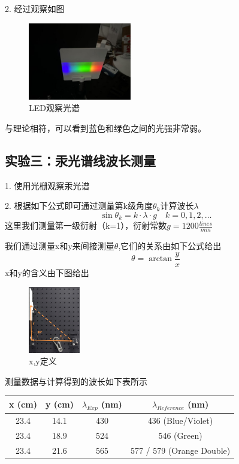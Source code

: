 \documentclass{ctexart}
\begin{document}
2. 经过观察如图
\begin{figure}[H]
    \centering
    \includegraphics[width=0.4\textwidth,height=0.2\textwidth]{pictures/微信图片_20241107162045.jpg}
    \caption{LED观察光谱}
\end{figure}
与理论相符，可以看到蓝色和绿色之间的光强非常弱。

\subsection{实验三：汞光谱线波长测量}
1. 使用光栅观察汞光谱

2. 根据如下公式即可通过测量第k级角度$\theta_k$计算波长$\lambda$
\begin{equation}
    \sin \theta_k = k \cdot \lambda \cdot g \quad k=0,1,2,\ldots
\end{equation}
这里我们测量第一级衍射（k=1），衍射常数$g=1200  \frac{lines}{mm}$

我们通过测量x和y来间接测量$\theta$,它们的关系由如下公式给出
\begin{equation}
    \theta =\arctan \frac{y}{x}
\end{equation}
x和y的含义由下图给出
\begin{figure}[H]
    \centering
    \includegraphics[width=0.2\textwidth,height=0.3\textwidth]{pictures/xy示意图.png}
    \caption{x,y定义}
\end{figure}
测量数据与计算得到的波长如下表所示
\begin{table}[h]
    \centering
    \begin{tabular}{|c|c|c|c|}
        \hline
        \rowcolor{yellow!25} x (cm) & y (cm) & $\lambda_{Exp}$ (nm) & $\lambda_{Reference}$ (nm) \\
        \hline
        23.4   & 14.1   & 430                  & 436 (Blue/Violet)           \\
        \hline
        23.4   & 18.9   & 524                  & 546 (Green)                 \\
        \hline
        23.4   & 21.6   & 565                  & 577 / 579 (Orange Double)   \\
        \hline
    \end{tabular}
\end{table}
\end{document}
